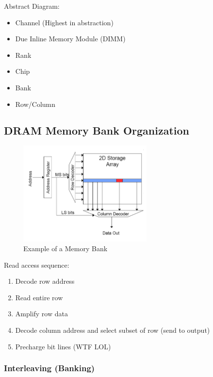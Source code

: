 \documentclass[]{article}
\providecommand{\tightlist}{%
  \setlength{\itemsep}{0pt}\setlength{\parskip}{0pt}}
\begin{document}
Abstract Diagram:

\begin{itemize}
\tightlist
\item
  Channel (Highest in abstraction)
\item
  Due Inline Memory Module (DIMM)
\item
  Rank
\item
  Chip
\item
  Bank
\item
  Row/Column
\end{itemize}

\hypertarget{dram-memory-bank-organization}{%
\subsection{DRAM Memory Bank
Organization}\label{dram-memory-bank-organization}}

\begin{figure}
\centering
\includegraphics[width=0.6\textwidth,height=\textheight]{./tex2pdf.-ee748c56ff17e1e1/8dd461ecda617c9c6e95771cb49d649644087cc6.png}
\caption{Example of a Memory Bank}
\end{figure}

Read access sequence:

\begin{enumerate}
\def\labelenumi{\arabic{enumi}.}
\tightlist
\item
  Decode row address
\item
  Read entire row
\item
  Amplify row data
\item
  Decode column address and select subset of row (send to output)
\item
  Precharge bit lines (WTF LOL)
\end{enumerate}

\hypertarget{interleaving-banking}{%
\subsubsection{Interleaving (Banking)}\label{interleaving-banking}}
\end{document}
